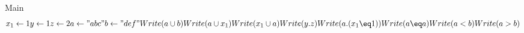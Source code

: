 Main
\[
  x_1 \gets 1
  y \gets 1
  z \gets 2
  a \gets "abc"
  b \gets "def"
  Write(a \cup b)
  Write(a \cup x_1)
  Write(x_1 \cup a)
  Write(y.z)
  Write(a.(x_1 \eq 1))
  Write(a \eq a)
  Write(a < b)
  Write(a > b)

\]